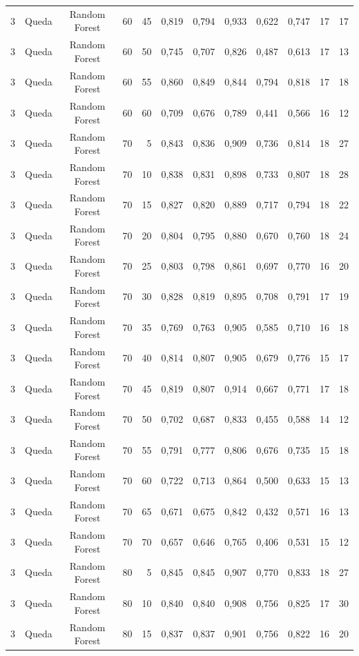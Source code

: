 \begin{longtable}{ccclrrrrrrrr}
3 & Queda & Random Forest & 60 & 45 & 0,819 & 0,794 & 0,933 & 0,622 & 0,747 & 17 & 17 \\
3 & Queda & Random Forest & 60 & 50 & 0,745 & 0,707 & 0,826 & 0,487 & 0,613 & 17 & 13 \\
3 & Queda & Random Forest & 60 & 55 & 0,860 & 0,849 & 0,844 & 0,794 & 0,818 & 17 & 18 \\
3 & Queda & Random Forest & 60 & 60 & 0,709 & 0,676 & 0,789 & 0,441 & 0,566 & 16 & 12 \\
3 & Queda & Random Forest & 70 & 5 & 0,843 & 0,836 & 0,909 & 0,736 & 0,814 & 18 & 27 \\
3 & Queda & Random Forest & 70 & 10 & 0,838 & 0,831 & 0,898 & 0,733 & 0,807 & 18 & 28 \\
3 & Queda & Random Forest & 70 & 15 & 0,827 & 0,820 & 0,889 & 0,717 & 0,794 & 18 & 22 \\
3 & Queda & Random Forest & 70 & 20 & 0,804 & 0,795 & 0,880 & 0,670 & 0,760 & 18 & 24 \\
3 & Queda & Random Forest & 70 & 25 & 0,803 & 0,798 & 0,861 & 0,697 & 0,770 & 16 & 20 \\
3 & Queda & Random Forest & 70 & 30 & 0,828 & 0,819 & 0,895 & 0,708 & 0,791 & 17 & 19 \\
3 & Queda & Random Forest & 70 & 35 & 0,769 & 0,763 & 0,905 & 0,585 & 0,710 & 16 & 18 \\
3 & Queda & Random Forest & 70 & 40 & 0,814 & 0,807 & 0,905 & 0,679 & 0,776 & 15 & 17 \\
3 & Queda & Random Forest & 70 & 45 & 0,819 & 0,807 & 0,914 & 0,667 & 0,771 & 17 & 18 \\
3 & Queda & Random Forest & 70 & 50 & 0,702 & 0,687 & 0,833 & 0,455 & 0,588 & 14 & 12 \\
3 & Queda & Random Forest & 70 & 55 & 0,791 & 0,777 & 0,806 & 0,676 & 0,735 & 15 & 18 \\
3 & Queda & Random Forest & 70 & 60 & 0,722 & 0,713 & 0,864 & 0,500 & 0,633 & 15 & 13 \\
3 & Queda & Random Forest & 70 & 65 & 0,671 & 0,675 & 0,842 & 0,432 & 0,571 & 16 & 13 \\
3 & Queda & Random Forest & 70 & 70 & 0,657 & 0,646 & 0,765 & 0,406 & 0,531 & 15 & 12 \\
3 & Queda & Random Forest & 80 & 5 & 0,845 & 0,845 & 0,907 & 0,770 & 0,833 & 18 & 27 \\
3 & Queda & Random Forest & 80 & 10 & 0,840 & 0,840 & 0,908 & 0,756 & 0,825 & 17 & 30 \\
3 & Queda & Random Forest & 80 & 15 & 0,837 & 0,837 & 0,901 & 0,756 & 0,822 & 16 & 20 \\

\end{longtable}
